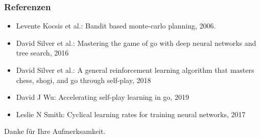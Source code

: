 \begin{frame}
 \frametitle{Referenzen}
  


\begin{itemize}
  \item Levente Kocsis et al.: Bandit based monte-carlo planning, 2006.
  \item David Silver et al.: Mastering the game of go with deep neural networks and tree search, 2016
  \item David Silver et al.: A general reinforcement learning algorithm that masters chess, shogi, and go through self-play, 2018
  \item David J Wu: Accelerating self-play learning in go, 2019
  \item Leslie N Smith: Cyclical learning rates for training neural networks, 2017
\end{itemize}

\centering Danke für Ihre Aufmerksamkeit.


  
\end{frame}


